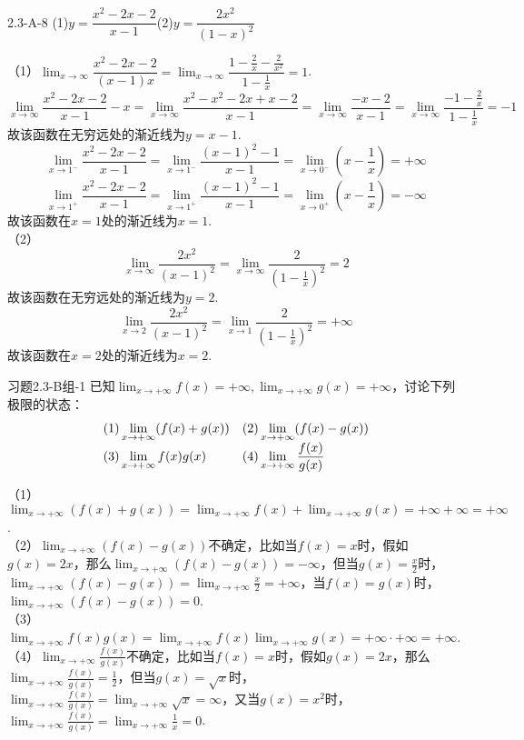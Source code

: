 \begin{example}{2.3-A-8}{}
    (1)$y=\dfrac{x^2-2x-2}{x-1}$\quad(2)$y=\dfrac{2x^2}{(1-x)^2}$\end{example}
\begin{solution}
    （1）$\displaystyle\lim_{x\to \infty}\dfrac{x^2-2x-2}{(x-1)x}=\lim_{x\to \infty}\dfrac{1-\frac{2}{x}-\frac{2}{x^2}}{1-\frac{1}{x}}=1$.
        \[\displaystyle\lim_{x\to \infty}\dfrac{x^2-2x-2}{x-1}-x=\lim_{x\to \infty}\dfrac{x^2-x^2-2x+x-2}{x-1}=\lim_{x\to \infty}\dfrac{-x-2}{x-1}=\lim_{x\to \infty}\dfrac{-1-\frac{2}{x}}{1-\frac{1}{x}}=-1\]
        故该函数在无穷远处的渐近线为$y=x-1$.
        \[\displaystyle\lim_{x\to 1^{-}}\dfrac{x^2-2x-2}{x-1}=\lim_{x\to 1^{-}}\dfrac{(x-1)^2-1}{x-1}=\lim_{x\to 0^{-}}(x-\dfrac{1}{x})=+\infty\]
        \[\displaystyle\lim_{x\to 1^{+}}\dfrac{x^2-2x-2}{x-1}=\lim_{x\to 1^{+}}\dfrac{(x-1)^2-1}{x-1}=\lim_{x\to 0^{+}}(x-\dfrac{1}{x})=-\infty\]
        故该函数在$x=1$处的渐近线为$x=1$.\\
    （2）\[\displaystyle\lim_{x\to \infty}\dfrac{2x^2}{(x-1)^2}=\lim_{x\to \infty}\dfrac{2}{(1-\frac{1}{x})^2}=2\]
        故该函数在无穷远处的渐近线为$y=2$.
        \[\displaystyle\lim_{x\to 2}\dfrac{2x^2}{(x-1)^2}=\lim_{x\to 1}\dfrac{2}{(1-\frac{1}{x})^2}=+\infty\]
        故该函数在$x=2$处的渐近线为$x=2$.
\end{solution}
\begin{example}{习题2.3-B组-1}{}
    已知$\displaystyle\lim_{x\to +\infty}f(x)=+\infty,\lim_{x\to +\infty}g(x)=+\infty$，讨论下列极限的状态：
    \vspace{-10pt}\[\begin{array}{l@{\quad}l}(1)\displaystyle\lim_{x\to +\infty}(f(x)+g(x))&(2)\displaystyle\lim_{x\to +\infty}(f(x)-g(x))\\
        (3)\displaystyle\lim_{x\to +\infty}f(x)g(x)&(4)\displaystyle\lim_{x\to +\infty}\frac{f(x)}{g(x)}\end{array}\]
\end{example}
\begin{solution}
    （1）$\displaystyle\lim_{x\to +\infty}(f(x)+g(x))=\lim_{x\to +\infty}f(x)+\lim_{x\to +\infty}g(x)=+\infty+\infty=+\infty$.\\
    （2）$\displaystyle\lim_{x\to +\infty}(f(x)-g(x))$不确定，比如当$f(x)=x$时，假如$g(x)=2x$，那么$\displaystyle\lim_{x\to +\infty}(f(x)-g(x))=-\infty$，但当$g(x)=\frac{x}{2}$时，$\displaystyle\lim_{x\to +\infty}(f(x)-g(x))=\lim_{x\to +\infty}\frac{x}{2}=+\infty$，当$f(x)=g(x)$时，$\displaystyle\lim_{x\to +\infty}(f(x)-g(x))=0$.\\
    （3）$\displaystyle\lim_{x\to +\infty}f(x)g(x)=\lim_{x\to +\infty}f(x)\lim_{x\to +\infty}g(x)=+\infty\cdot +\infty=+\infty$.\\
    （4）$\displaystyle\lim_{x\to +\infty}\frac{f(x)}{g(x)}$不确定，比如当$f(x)=x$时，假如$g(x)=2x$，那么$\displaystyle\lim_{x\to +\infty}\frac{f(x)}{g(x)}=\frac{1}{2}$，但当$g(x)=\sqrt{x}$时，$\displaystyle\lim_{x\to +\infty}\frac{f(x)}{g(x)}=\lim_{x\to +\infty}\sqrt{x}=\infty$，又当$g(x)=x^2$时，$\displaystyle\lim_{x\to +\infty}\frac{f(x)}{g(x)}=\lim_{x\to +\infty}\frac{1}{x}=0$.
\end{solution}
